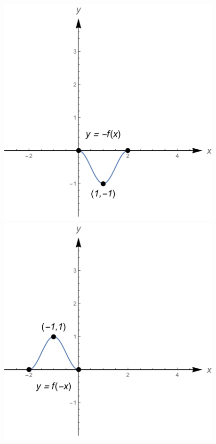 \begin{Answer}
\begin{figure}[H]
{        \hspace{0.1cm}
        \includegraphics[scale=0.3]{fig_functions_oef_8e}
        \hspace{0.1cm}
        \includegraphics[scale=0.3]{fig_functions_oef_8f}
}
\end{figure}
\end{Answer}

